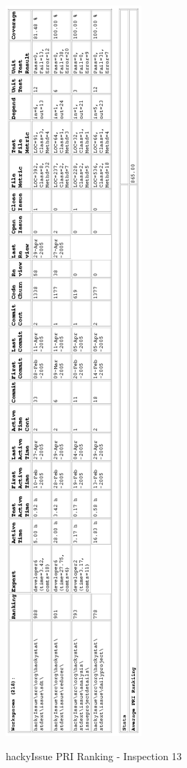\begin{figure}[htb]
  \centering
  \caption{hackyIssue PRI Ranking - Inspection 13}
  \includegraphics[totalheight=1.0\textheight]{figs/Results/13_2005-05-02-hackyIssue-printable.eps}
  \label{fig:inspection13-hackyIssue-ranking}
\end{figure}



